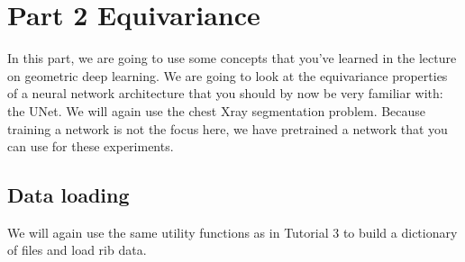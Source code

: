 \documentclass[letterpaper,10pt,english]{jupyterBook}
\begin{document}
\section{Part 2 \sphinxhyphen{} Equivariance}
\label{\detokenize{notebooks/Tutorial6_Registration/Tutorial6_Registration_student:part-2-equivariance}}
\sphinxAtStartPar
In this part, we are going to use some concepts that you’ve learned in the lecture on geometric deep learning. We are going to look at the equivariance properties of a neural network architecture that you should by now be very familiar with: the U\sphinxhyphen{}Net. We will again use the chest X\sphinxhyphen{}ray segmentation problem. Because training a network is not the focus here, we have pretrained a network that you can use for these experiments.


\subsection{Data loading}
\label{\detokenize{notebooks/Tutorial6_Registration/Tutorial6_Registration_student:data-loading}}
\sphinxAtStartPar
We will again use the same utility functions as in Tutorial 3 to build a dictionary of files and load rib data.
\end{document}
